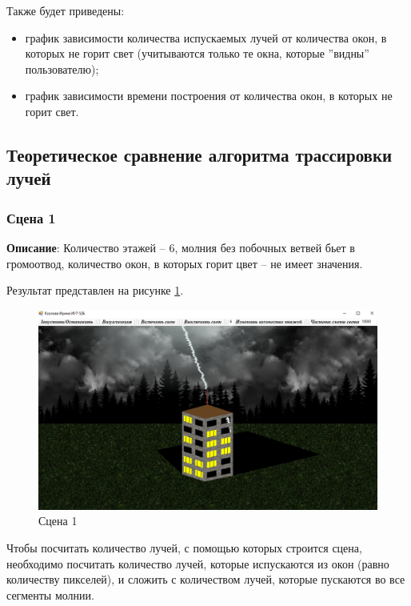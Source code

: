 Также будет приведены:
\begin{itemize}
	\item график зависимости количества испускаемых лучей от количества окон, в которых не горит свет (учитываются только те окна, которые  ''видны'' пользователю);
	\item график зависимости времени построения от количества окон, в которых не горит свет.
\end{itemize}


\subsection{Теоретическое сравнение алгоритма трассировки лучей}

\subsubsection{Сцена 1}

\textbf{Описание}: Количество этажей -- 6, молния без побочных ветвей бьет в громоотвод, количество окон, в которых горит цвет -- не имеет значения.

Результат представлен на рисунке \ref{img:s1}.
\begin{figure}[H]
	\begin{center}
		\includegraphics[scale=0.40]{img/prog_res/s1.png}
	\end{center}
	\captionsetup{justification=centering}
	\caption{Сцена 1}
	\label{img:s1}
\end{figure}

Чтобы посчитать количество лучей, с помощью которых строится сцена, необходимо посчитать количество лучей, которые испускаются из окон (равно количеству пикселей), и сложить с количеством лучей, которые пускаются во все сегменты молнии.

